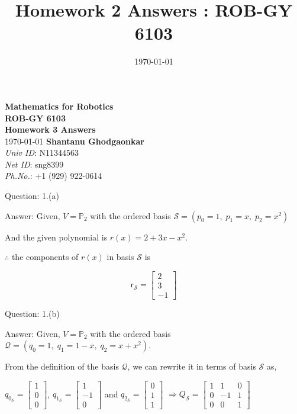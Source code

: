 \documentclass[a4paper]{article}
\title{Homework 2 Answers : ROB-GY 6103}
\author{\myName}
\date{\today}
\newcommand{\myName}{\textbf{Shantanu Ghodgaonkar}\\\textit{Univ ID}: N11344563\\\textit{Net ID}: sng8399\\\textit{Ph.No.}: +1 (929) 922-0614}
\begin{document}
	
	\begin{titlepage}
	    \centering
	    \vspace{2cm}
	    \Huge\textbf{Mathematics for Robotics \\ ROB-GY 6103 \\ Homework 3 Answers}
	    \vspace{1cm}
	    \\ \Large \today
	    \vfill
	    \Large \myName
	\end{titlepage}
	
	\begin{qalist}			
		\item[Question: 1.(a)] \setcounter{equation}{0} %
		\item[Answer:] Given, $V = {\mathbb{P}}_{2}$ with the ordered basis $\mathcal{S} = \left( {p}_{0} = 1,\;{p}_{1} = x,\;{p}_{2} = {x}^{2}\right)$ 
		
		And the given polynomial is $r(x) = 2 + 3x - {x}^{2}$.
		
		
		$\therefore$ the components of $r(x)$ in basis $\mathcal{S}$ is 
		
		\begin{equation}
			{\text{r}}_{\mathcal{S}} = \begin{bmatrix} 2 \\ 3 \\ -1 \end{bmatrix}
		\end{equation}
		
		\item[Question: 1.(b)] \setcounter{equation}{0} %
		\item[Answer:] Given, $V = {\mathbb{P}}_{2}$ with the ordered basis $\mathcal{Q} = \left( {q}_{0} = 1,\;{q}_{1} = 1 - x,\;{q}_{2} = x + {x}^{2}\right)$. 
		
		From the definition of the basis $\mathcal{Q}$, we can rewrite it in terms of basis $\mathcal{S}$ as, 
		
		${q}_{0_{\mathcal{S}}} = \begin{bmatrix}1 \\ 0 \\ 0\end{bmatrix}$, ${q}_{1_{\mathcal{S}}} = \begin{bmatrix}1 \\ -1 \\ 0\end{bmatrix}$ and ${q}_{2_{\mathcal{S}}} = \begin{bmatrix}0 \\ 1 \\ 1\end{bmatrix}$ $\Rightarrow {Q}_{\mathcal{S}} = \begin{bmatrix}1 & 1 & 0 \\ 0 & -1 & 1 \\ 0 & 0 & 1\end{bmatrix}$
		

\end{qalist}
\end{document}
